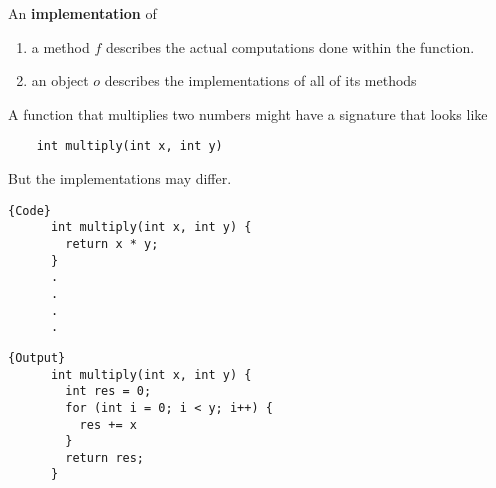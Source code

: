 \begin{definition}[Implementation]
  An \textbf{implementation} of 
  \begin{enumerate}
    \item a method $f$ describes the actual computations done within the function. 
    \item an object $o$ describes the implementations of all of its methods
  \end{enumerate}
\end{definition}

\begin{example}[Multiplication]
  A function that multiplies two numbers might have a signature that looks like
  \begin{lstlisting}
    int multiply(int x, int y)
  \end{lstlisting} 
  But the implementations may differ. 
  
  \noindent\begin{minipage}{.5\textwidth}
    \begin{lstlisting}[]{Code}
      int multiply(int x, int y) {
        return x * y;
      }
      .
      .
      .
      .
    \end{lstlisting}
    \end{minipage}
    \hfill
    \begin{minipage}{.49\textwidth}
    \begin{lstlisting}[]{Output}
      int multiply(int x, int y) {
        int res = 0; 
        for (int i = 0; i < y; i++) {
          res += x
        } 
        return res;
      }
    \end{lstlisting}
  \end{minipage}
\end{example} 

